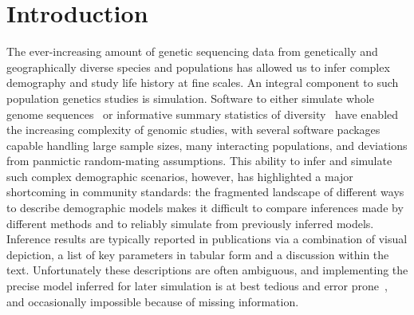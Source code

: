 \documentclass[11pt]{article}
\newcommand{\mhcomment}[1]{{\textcolor{cyan}{MH: #1}}}
\begin{document}
\section*{Introduction}

The ever-increasing amount of genetic sequencing data from genetically and
geographically diverse species and populations has allowed us to infer complex
demography and study life history at fine scales.
An integral component to such population genetics studies is simulation.
Software to either simulate whole genome
sequences~\citep{thornton2014cpp,thornton2019-nu,staab2015scrm,
baumdicker2021-iu,kelleher2016efficient,haller2019slim}
or informative summary statistics of
diversity~\citep{gutenkunst2009inferring,kamm2017efficient,jouganous2017inferring}
have enabled the increasing complexity of genomic studies, with several software
packages capable handling large sample sizes, many interacting populations, and
deviations from panmictic random-mating assumptions.
This ability to infer and simulate such complex demographic scenarios, however,
has highlighted a major shortcoming in community standards:
the fragmented landscape of different ways to describe demographic
models makes it difficult to compare inferences made by different methods
and to reliably simulate from previously inferred models.
Inference results are typically reported in publications
via a combination of visual depiction,
a list of key parameters in tabular form and a discussion within the text.
Unfortunately these descriptions are often ambiguous, and
implementing the precise model inferred for later simulation
is at best tedious and error prone~\citep{adrion2020community,ragsdale2020lessons},
and occasionally impossible because of missing information.
\end{document}
